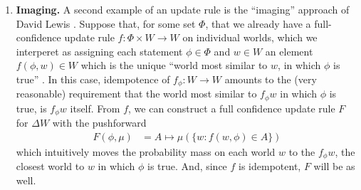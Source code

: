 \begin{enumerate}[wide, label=\textbf{\thesubsection.\arabic*}]
	\item
	\textbf{Imaging.}
	A second example of an update rule is the ``imaging'' approach of David Lewis
	\parencite{lewis1976probabilities}.
	Suppose that, for some set $\Phi$, that we already have a full-confidence update rule
	$f : \Phi \times W \to W$ on individual worlds, which we interperet as assigning each statement $\phi \in \Phi$ and $w \in W$ an element $f(\phi, w) \in W$ which is the unique ``world most similar to $w$, in which $\phi$ is true'' \parencite{gardenfors1979imaging}.
	In this case, idempotence of $f_\phi: W \to W$ amounts to the (very reasonable) requirement that the world most similar to $f_\phi w$ in which $\phi$ is true, is $f_\phi w$ itself.
	From $f$, we can construct a full confidence update rule $F$ for $\Delta W$
	with the pushforward	
	\[
    	\begin{aligned}
    		F(\phi, \mu) 
    			&= A \mapsto \mu(\{w : f(w, \phi) \in A\})
    	\end{aligned}
	\]
	which intuitively moves the probability mass on each world $w$ to the $f_\phi w$, the closest world to $w$ in which $\phi$ is true.
	And, since $f$ is idempotent, $F$ will be as well.


\end{enumerate}
